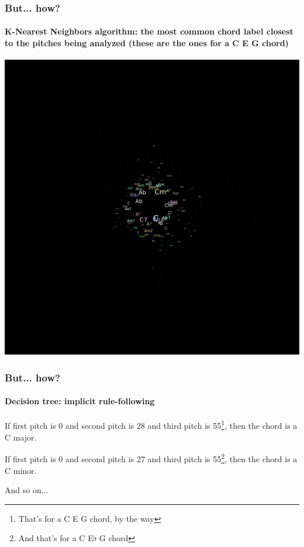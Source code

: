 \documentclass{beamer}
\begin{document}
\begin{frame}
  \frametitle{But... how?}
  \framesubtitle{K-Nearest Neighbors algorithm: the most common chord
    label closest to the pitches being analyzed (these are the ones for a C E G chord)}
  \addvspace{0.5em}
  \includegraphics[scale=0.3, trim = 50em 0em 0em 51em, clip]{figs/knn}
\end{frame}

\begin{frame}
  \frametitle{But... how?}
  \framesubtitle{Decision tree: implicit rule-following}
    \begin{large}
      If first pitch is 0 and second pitch is 28 and third pitch is
      55\footnote{That's for a C E G chord, by the way}, then the chord is a C
      major.

      \addvspace{1em}

      If first pitch is 0 and second pitch is 27 and third pitch is
      55\footnote{And that's for a C E$\flat$ G chord}, then the chord is a C
      minor.
    \end{large}
  \begin{center}

    \addvspace{3em}

    And so on...%
  \end{center}
\end{frame}
\end{document}
